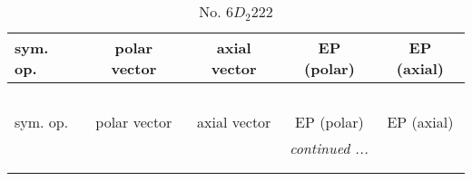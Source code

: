 \documentclass[fleqn,10pt,landscape]{jsarticle}
\begin{document}
\begin{center}
\renewcommand{\arraystretch}{1.3}
\begin{longtable}{lcccc}
\caption{No. 6\quad$D_{2}$\quad$222$\quad[ orthorhombic ]}
 \\
 \hline \hline
sym. op. & polar vector & axial vector & EP (polar) & EP (axial) \\ \hline \endfirsthead

\multicolumn{4}{l}{\tablename\ \thetable{}} \\
 \hline \hline
sym. op. & polar vector & axial vector & EP (polar) & EP (axial) \\ \hline \endhead

 \hline \hline
\multicolumn{4}{r}{\footnotesize\it continued ...} \\ \endfoot

 \hline \hline
\multicolumn{4}{r}{} \\ \endlastfoot


\end{longtable}
\end{center}
\end{document}
